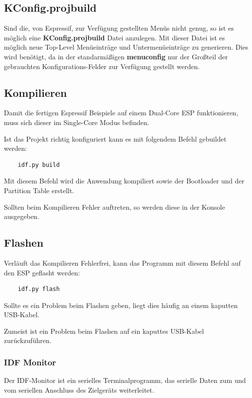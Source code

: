 \subsection{KConfig.projbuild}\label{sec:esp-idf-projbuild}
Sind die, von Espressif, zur Verfügung gestellten Menüs nicht genug, so ist es möglich eine \textbf{KConfig.projbuild} Datei anzulegen. Mit dieser Datei ist es möglich neue Top-Level Menüeinträge und Untermenüeinträge zu generieren. Dies wird benötigt, da in der standarmäßigen \textbf{menuconfig} nur der Großteil der gebrauchten Konfigurations-Felder zur Verfügung gestellt werden.

\subsection{Kompilieren}
Damit die fertigen Espressif Beispiele auf einem Dual-Core ESP funktionieren, muss sich dieser im Single-Core Modus befinden.

Ist das Projekt richtig konfiguriert kann es mit folgendem Befehl gebuildet werden:
\begin{verbatim}
    idf.py build
\end{verbatim}

Mit diesem Befehl wird die Anwendung kompiliert sowie der Bootloader und der Partition Table erstellt.

Sollten beim Kompilieren Fehler auftreten, so werden diese in der Konsole ausgegeben.

\subsection{Flashen}
Verläuft das Kompilieren Fehlerfrei, kann das Programm mit diesem Befehl auf den ESP geflasht werden:
\begin{verbatim}
    idf.py flash
\end{verbatim}

Sollte es ein Problem beim Flashen geben, liegt dies häufig an einem kaputten USB-Kabel.

Zumeist ist ein Problem beim Flashen auf ein kaputtes USB-Kabel zurückzuführen.

\subsubsection{IDF Monitor}\label{sec:monitor}
Der IDF-Monitor ist ein serielles Terminalprogramm, das serielle Daten zum und vom seriellen Anschluss des Zielgeräts weiterleitet.

